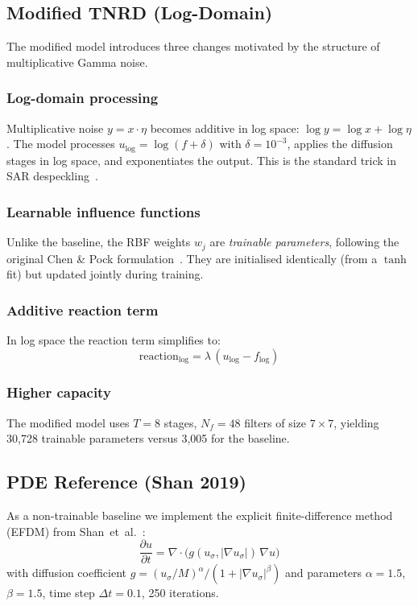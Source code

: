 \documentclass[10pt,conference]{IEEEtran}
\begin{document}
\subsection{Modified TNRD (Log-Domain)}

The modified model introduces three changes motivated by the structure of
multiplicative Gamma noise.

\subsubsection{Log-domain processing}
Multiplicative noise $y = x \cdot \eta$ becomes additive in log space:
$\log y = \log x + \log \eta$.  The model processes $u_{\log} = \log(f +
\delta)$ with $\delta{=}10^{-3}$, applies the diffusion stages in log space,
and exponentiates the output.  This is the standard trick in SAR
despeckling~\cite{chen2017}.

\subsubsection{Learnable influence functions}
Unlike the baseline, the RBF weights $w_j$ are \emph{trainable parameters},
following the original Chen \& Pock formulation~\cite{chen2017}.  They are
initialised identically (from a $\tanh$ fit) but updated jointly during
training.

\subsubsection{Additive reaction term}
In log space the reaction term simplifies to:
\begin{equation}
\text{reaction}_{\log} = \lambda\,(u_{\log} - f_{\log})
\end{equation}

\subsubsection{Higher capacity}
The modified model uses $T{=}8$ stages, $N_f{=}48$ filters of size
$7{\times}7$, yielding 30{,}728 trainable parameters versus 3{,}005 for the
baseline.

\subsection{PDE Reference (Shan 2019)}

As a non-trainable baseline we implement the explicit finite-difference method
(EFDM) from Shan~et~al.~\cite{shan2019}:
\begin{equation}
\frac{\partial u}{\partial t} = \nabla\!\cdot\!\bigl(g(u_\sigma, |\nabla u_\sigma|)\,\nabla u\bigr)
\end{equation}
with diffusion coefficient $g = (u_\sigma/M)^\alpha / (1 + |\nabla
u_\sigma|^\beta)$ and parameters $\alpha{=}1.5$, $\beta{=}1.5$, time step
$\Delta t{=}0.1$, 250 iterations.
\end{document}
